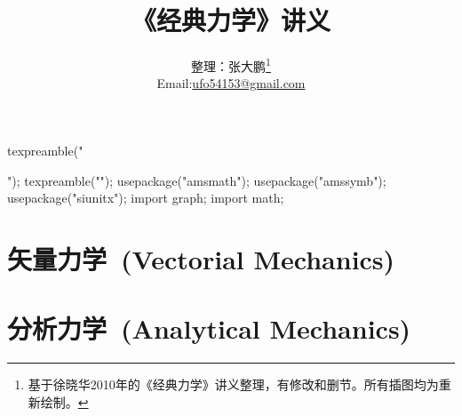 \documentclass{inkbook}
\title{《经典力学》讲义}
\author{整理：张大鹏\thanks{基于徐晓华2010年的《经典力学》讲义整理，有修改和删节。所有插图均为重新绘制。}\\ Email:\url{ufo54153@gmail.com}}
\begin{document}
\begin{asydef}
	texpreamble("\usepackage{xeCJK}");
	texpreamble("");
	usepackage("amsmath");
	usepackage("amssymb");
	usepackage("siunitx");
	import graph;
	import math;
\end{asydef}

\maketitle

\frontmatter

\tableofcontents
\cleardoublepage

\mainmatter

\part[矢量力学]{矢量力学\ (Vectorial Mechanics)}




\part[分析力学]{分析力学\ (Analytical Mechanics)}












\appendix




\backmatter
 
\titleformat{\chapter}[hang]{\heiti\LARGE}{}{0mm}{\hspace{-0.4cm}\mybackmatter}



\end{document}
